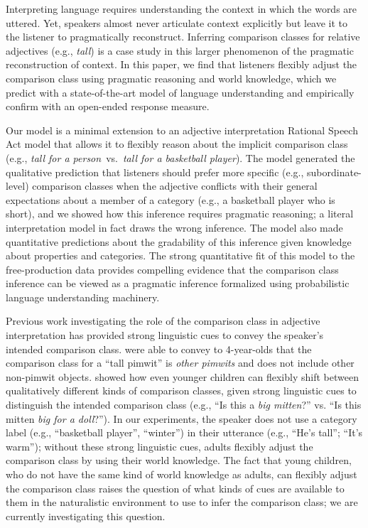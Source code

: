 \documentclass[doc]{apa6}
\begin{document}
Interpreting language requires understanding the context in which the words are uttered.
Yet, speakers almost never articulate context explicitly but leave it to the listener to pragmatically reconstruct. 
Inferring comparison classes for relative adjectives (e.g., \emph{tall}) is a case study in this larger phenomenon of the pragmatic reconstruction of context.
In this paper, we find that listeners flexibly adjust the comparison class using pragmatic reasoning and world knowledge, which we predict with a state-of-the-art model of language understanding and empirically confirm with an open-ended response measure.

Our model is a minimal extension to an adjective interpretation Rational Speech Act model that allows it to flexibly reason about the implicit comparison class (e.g., \emph{tall for a person}~vs.~\emph{tall for a basketball player}).
The model generated the qualitative prediction that listeners should prefer more specific (e.g., subordinate-level) comparison classes when the adjective conflicts with their general expectations about a member of a category (e.g., a basketball player who is short), and we showed how this inference requires pragmatic reasoning; a literal interpretation model in fact draws the wrong inference.
The model also made quantitative predictions about the gradability of this inference given knowledge about properties and categories. 
The strong quantitative fit of this model to the free-production data provides compelling evidence that the comparison class inference can be viewed as a pragmatic inference formalized using probabilistic language understanding machinery.

Previous work investigating the role of the comparison class in adjective interpretation has provided strong linguistic cues to convey the speaker's intended comparison class. 
 were able to convey to 4-year-olds that the comparison class for a ``tall pimwit'' is \emph{other pimwits} and does not include other non-pimwit objects.
 showed how even younger children can flexibly shift between qualitatively different kinds of comparison classes, given strong linguistic cues to distinguish the intended comparison class (e.g., ``Is this a \emph{big mitten}?'' vs. ``Is this mitten \emph{big for a doll}?'').
In our experiments, the speaker does not use a category label (e.g., ``basketball player'', ``winter'') in their utterance (e.g., ``He's tall''; ``It's warm''); without these strong linguistic cues, adults flexibly adjust the comparison class by using their world knowledge. 
The fact that young children, who do not have the same kind of world knowledge as adults, can flexibly adjust the comparison class raises the question of what kinds of cues are available to them in the naturalistic environment to use to infer the comparison class; we are currently investigating this question.
\end{document}
